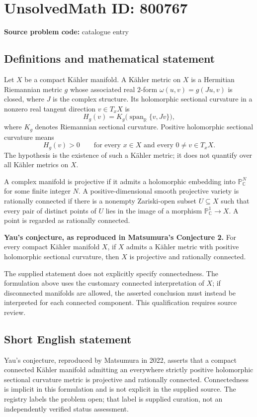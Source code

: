 \documentclass[11pt]{article}
\newcommand{\R}{\mathbb{R}}
\newcommand{\C}{\mathbb{C}}
\newcommand{\PP}{\mathbb{P}}
\begin{document}
\section*{UnsolvedMath ID: 800767}
\textbf{Source problem code:} catalogue entry
\subsection{Definitions and mathematical statement}
Let \(X\) be a compact K\"ahler manifold. A K\"ahler metric on \(X\) is a Hermitian Riemannian metric \(g\) whose associated real \(2\)-form \(\omega(u,v)=g(Ju,v)\) is closed, where \(J\) is the complex structure. Its holomorphic sectional curvature in a nonzero real tangent direction \(v\in T_xX\) is
\[
H_g(v)=K_g\bigl(\operatorname{span}_{\R}\{v,Jv\}\bigr),
\]
where \(K_g\) denotes Riemannian sectional curvature. Positive holomorphic sectional curvature means
\[
H_g(v)>0\qquad\text{for every }x\in X\text{ and every }0\ne v\in T_xX.
\]
The hypothesis is the existence of such a K\"ahler metric; it does not quantify over all K\"ahler metrics on \(X\).

A complex manifold is projective if it admits a holomorphic embedding into \(\PP^N_{\C}\) for some finite integer \(N\). A positive-dimensional smooth projective variety is rationally connected if there is a nonempty Zariski-open subset \(U\subseteq X\) such that every pair of distinct points of \(U\) lies in the image of a morphism \(\PP^1_{\C}\to X\). A point is regarded as rationally connected.

\textbf{Yau's conjecture, as reproduced in Matsumura's Conjecture 2.} For every compact K\"ahler manifold \(X\), if \(X\) admits a K\"ahler metric with positive holomorphic sectional curvature, then \(X\) is projective and rationally connected.

The supplied statement does not explicitly specify connectedness. The formulation above uses the customary connected interpretation of \(X\); if disconnected manifolds are allowed, the asserted conclusion must instead be interpreted for each connected component. This qualification requires source review.
\subsection{Short English statement}
Yau's conjecture, reproduced by Matsumura in 2022, asserts that a compact connected K\"ahler manifold admitting an everywhere strictly positive holomorphic sectional curvature metric is projective and rationally connected. Connectedness is implicit in this formulation and is not explicit in the supplied source. The registry labels the problem open; that label is supplied curation, not an independently verified status assessment.
\end{document}
